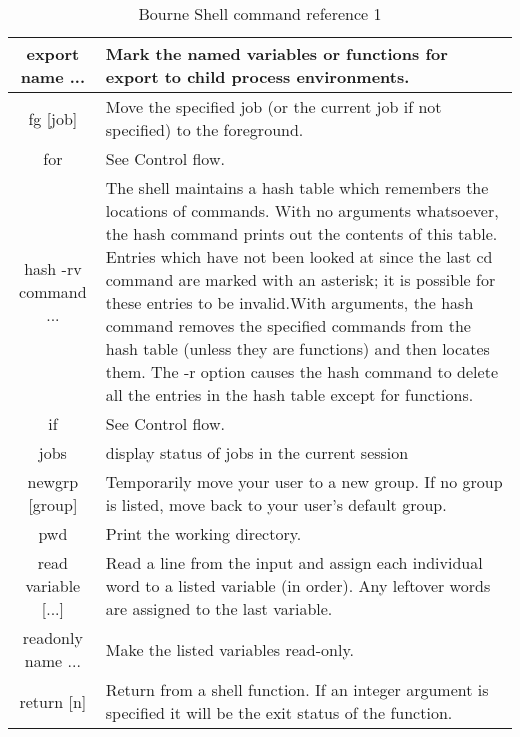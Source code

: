 \begin{table*}[H]
\begin{tabular}{|c|p{10cm}|}
		 export name ... &  Mark the named variables or functions for export to child process environments. \\ \hline
		 fg [job] &  Move the specified job (or the current job if not specified) to the foreground. \\ \hline
		 for &  See Control flow. \\ \hline
		 hash -rv command ... &  The shell maintains a hash table which remembers the locations of commands. With no arguments whatsoever, the hash command prints out the contents of this table. Entries which have not been looked at since the last cd command are marked with an asterisk; it is possible for these entries to be invalid.With arguments, the hash command removes the specified commands from the hash table (unless they are functions) and then locates them. The -r option causes the hash command to delete all the entries in the hash table except for functions. \\ \hline
		 if &  See Control flow. \\ \hline
		 jobs & display status of jobs in the current session \\ \hline
		 newgrp [group] &  Temporarily move your user to a new group. If no group is listed, move back to your user's default group. \\ \hline
		 pwd &  Print the working directory. \\ \hline
		 read variable [...] &  Read a line from the input and assign each individual word to a listed variable (in order). Any leftover words are assigned to the last variable. \\ \hline
		 readonly name ... &  Make the listed variables read-only. \\ \hline
		 return [n] &  Return from a shell function. If an integer argument is specified it will be the exit status of the function. \\ \hline
	\end{tabular}
	\caption{Bourne Shell command reference 1}
	\label{tab:refcmd1} 
\end{table*}

